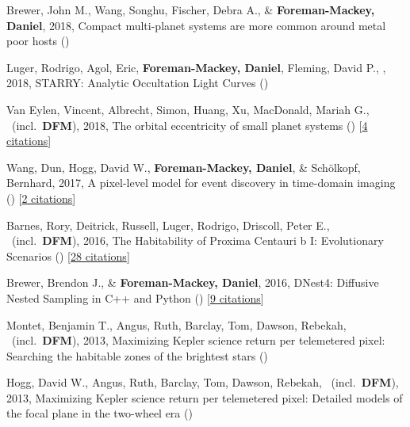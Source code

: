 \item[{\color{numcolor}\scriptsize8}] Brewer, John M., Wang, Songhu, Fischer, Debra A., \& \textbf{Foreman-Mackey, Daniel}, 2018, Compact multi-planet systems are more common around metal poor hosts ()

\item[{\color{numcolor}\scriptsize7}] Luger, Rodrigo, Agol, Eric, \textbf{Foreman-Mackey, Daniel}, Fleming, David P., \etal, 2018, STARRY: Analytic Occultation Light Curves ()

\item[{\color{numcolor}\scriptsize6}] Van Eylen, Vincent, Albrecht, Simon, Huang, Xu, MacDonald, Mariah G., \etal\ (incl.\ \textbf{DFM}), 2018, The orbital eccentricity of small planet systems () [\href{http://adsabs.harvard.edu/abs/2018arXiv180700549V}{4 citations}]

\item[{\color{numcolor}\scriptsize5}] Wang, Dun, Hogg, David W., \textbf{Foreman-Mackey, Daniel}, \& Sch{\"o}lkopf, Bernhard, 2017, A pixel-level model for event discovery in time-domain imaging () [\href{http://adsabs.harvard.edu/abs/2017arXiv171002428W}{2 citations}]

\item[{\color{numcolor}\scriptsize4}] Barnes, Rory, Deitrick, Russell, Luger, Rodrigo, Driscoll, Peter E., \etal\ (incl.\ \textbf{DFM}), 2016, The Habitability of Proxima Centauri b I: Evolutionary Scenarios () [\href{http://adsabs.harvard.edu/abs/2016arXiv160806919B}{28 citations}]

\item[{\color{numcolor}\scriptsize3}] Brewer, Brendon J., \& \textbf{Foreman-Mackey, Daniel}, 2016, DNest4: Diffusive Nested Sampling in C++ and Python () [\href{http://adsabs.harvard.edu/abs/2016arXiv160603757B}{9 citations}]

\item[{\color{numcolor}\scriptsize2}] Montet, Benjamin T., Angus, Ruth, Barclay, Tom, Dawson, Rebekah, \etal\ (incl.\ \textbf{DFM}), 2013, Maximizing Kepler science return per telemetered pixel: Searching the habitable zones of the brightest stars ()

\item[{\color{numcolor}\scriptsize1}] Hogg, David W., Angus, Ruth, Barclay, Tom, Dawson, Rebekah, \etal\ (incl.\ \textbf{DFM}), 2013, Maximizing Kepler science return per telemetered pixel: Detailed models of the focal plane in the two-wheel era ()